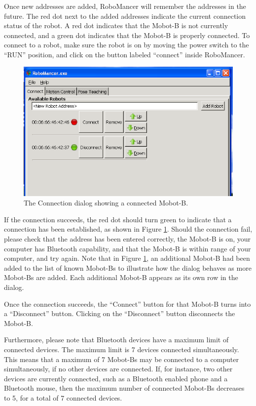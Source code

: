 \documentclass{article}
\begin{document}
Once new addresses are added, RoboMancer will remember the addresses in the future. 
The red dot next to the added addresses indicate
the current connection status of the robot. A red dot indicates that the Mobot-B
is not currently connected, and a green dot indicates that the Mobot-B is 
properly connected. To connect to a robot, make sure the robot is on by moving the 
power switch to the ``RUN'' position, and click on the button labeled ``connect'' 
inside RoboMancer.

\begin{figure}[H]
\begin{center}
\includegraphics[width=4.5in]{images/robomancer_screenshot4_connected.png}
\end{center}
\caption{\label{fig:shot4.png} The Connection dialog showing a connected Mobot-B.}
\end{figure}

If the connection succeeds, the red dot should
turn green to indicate that a connection has been established, as shown in 
Figure \ref{fig:shot4.png}.  Should the connection
fail, please check that the address has been entered correctly, the Mobot-B is on,
your computer has Bluetooth capability, and that the Mobot-B is within range of 
your computer, and try again.
Note that in Figure \ref{fig:shot4.png}, an additional
Mobot-B had been added to the list of known Mobot-Bs to illustrate how the dialog
behaves as more Mobot-Bs are added. Each additional Mobot-B appears as its own
row in the dialog.

Once the connection succeeds, the ``Connect'' button for that Mobot-B turns into
a ``Disconnect'' button. Clicking on the ``Disconnect'' button disconnects
the Mobot-B.

Furthermore, please note that Bluetooth devices have a maximum limit of connected 
devices. The maximum limit is 7 devices connected simultaneously. This means that 
a maximum of 7 Mobot-Bs may be connected to a computer simultaneously, if no
other devices are connected. If, for instance, two other devices are currently 
connected, such as a Bluetooth enabled phone and a Bluetooth mouse, then the 
maximum number of connected Mobot-Bs decreases to 5, for a total of 7 connected 
devices.
\end{document}
